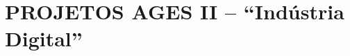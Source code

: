 \chapter[PROJETOS AGES II -- ``Indústria Digital'']{PROJETOS AGES II -- ``Indústria Digital''}





